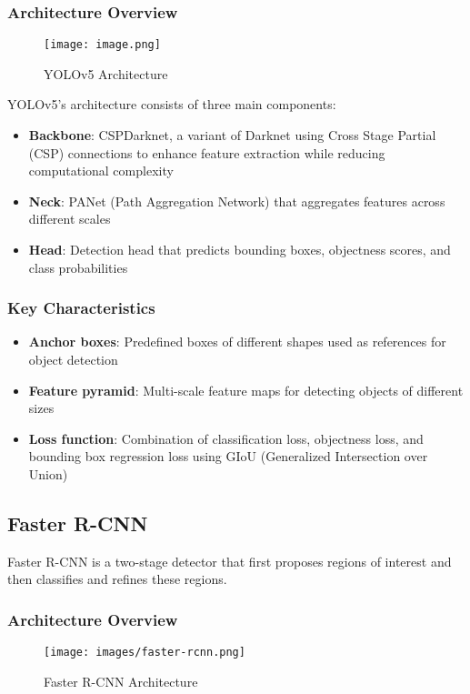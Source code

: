 \documentclass[12pt,a4paper]{article}
\begin{document}
\subsubsection{Architecture Overview}
\begin{figure}[H]
    \centering
        \centering
        \texttt{[image: image.png]}
        \caption{YOLOv5 Architecture}
    \label{fig:yolov5}
\end{figure}

YOLOv5's architecture consists of three main components:
\begin{itemize}
    \item \textbf{Backbone}: CSPDarknet, a variant of Darknet using Cross Stage Partial (CSP) connections to enhance feature extraction while reducing computational complexity
    \item \textbf{Neck}: PANet (Path Aggregation Network) that aggregates features across different scales
    \item \textbf{Head}: Detection head that predicts bounding boxes, objectness scores, and class probabilities
\end{itemize}

\subsubsection{Key Characteristics}
\begin{itemize}
    \item \textbf{Anchor boxes}: Predefined boxes of different shapes used as references for object detection
    \item \textbf{Feature pyramid}: Multi-scale feature maps for detecting objects of different sizes
    \item \textbf{Loss function}: Combination of classification loss, objectness loss, and bounding box regression loss using GIoU (Generalized Intersection over Union)
\end{itemize}


\subsection{Faster R-CNN}
Faster R-CNN is a two-stage detector that first proposes regions of interest and then classifies and refines these regions.

\subsubsection{Architecture Overview}
\begin{figure}[H]
    \centering
        \texttt{[image: images/faster-rcnn.png]}
        \caption{Faster R-CNN Architecture}
    \label{fig:faster_rcnn}
\end{figure}
\end{document}
